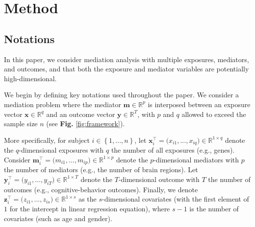 \documentclass[
  12pt]{article}
\def\R{\mathbb{R}}
\def\M{\mathbf{m}}
\def\X{\mathbf{x}}
\def\Y{\mathbf{y}}
\def\Z{\mathbf{z}}
\begin{document}
\vspace{-1em}
\section{Method} \label{sec:method}
\vspace{-.75em}
\subsection{Notations}

In this paper, we consider mediation analysis with multiple exposures, mediators, and outcomes, and that both the exposure and mediator variables are potentially high-dimensional.

We begin by defining key notations used throughout the paper. We consider a mediation problem where the mediator $\mathbf{m} \in \mathbb{R}^{p}$ is interposed between an exposure vector $\mathbf {x} \in \mathbb{R}^{q}$ and an outcome vector $\mathbf {y} \in \mathbb{R}^{T}$, with $p$ and $q$ allowed to exceed the sample size $n$ (see \textbf{Fig.} \ref{fig:framework}).

More specifically, for subject $i \in \left\{ 1, ..., n \right\}$, let $\mathbf{x}_{i}^{\top} = \big( x_{i1}, ..., x_{i q} \big) \in \R^{1 \times  q}$ denote the $q$-dimensional exposures with $q$ the number of all exposures (e.g., genes). Consider $\mathbf {m}_{i}^{\top} = \big( m_{i1},... , m_{ip}  \big) \in \R^{1  \times  p}$ denote the $p$-dimensional mediators with $p$ the number of mediators (e.g., the number of brain regions). Let $\mathbf{y}_{i}^{\top} = \big( y_{i1}, ..., y_{iT}  \big) \in \R^{1  \times  T}$ denote the $T$-dimensional outcome with $T$ the number of outcomes (e.g., cognitive-behavior outcomes). Finally, we denote $\mathbf{z}_{i}^{\top} = \big( z_{i1}, ..., z_{is} \big)  \in \R^{1 \times  s}$ as the $s$-dimensional covariates (with the first element of $1$ for the intercept in linear regression equation), where $s-1$ is the number of covariates (such as age and gender).


\end{document}
